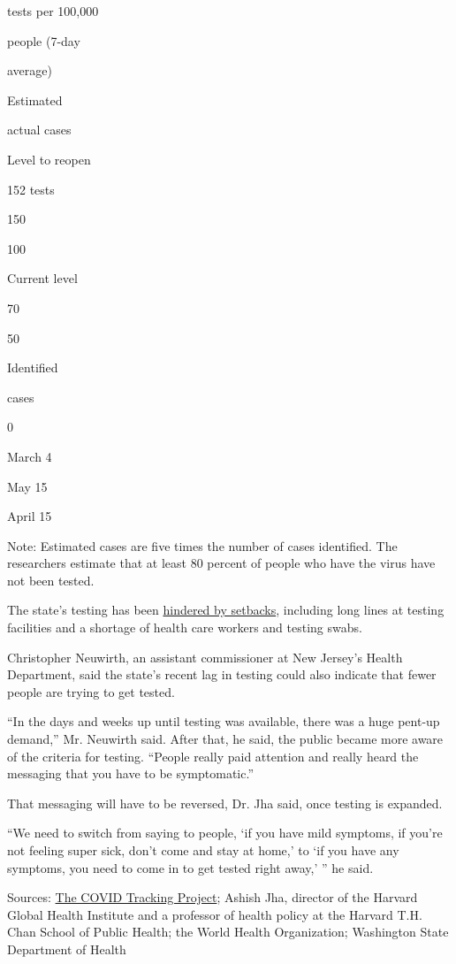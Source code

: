 tests per 100,000

people (7-day

average)

Estimated

actual cases

Level to reopen

152 tests

150

100

Current level

70

50

Identified

cases

0

March 4

May 15

April 15

Note: Estimated cases are five times the number of cases identified. The
researchers estimate that at least 80 percent of people who have the
virus have not been tested.

The state's testing has been
\href{https://www.nytimes3xbfgragh.onion/2020/04/13/nyregion/coronavirus-testing.html}{hindered
by setbacks}, including long lines at testing facilities and a shortage
of health care workers and testing swabs.

Christopher Neuwirth, an assistant commissioner at New Jersey's Health
Department, said the state's recent lag in testing could also indicate
that fewer people are trying to get tested.

``In the days and weeks up until testing was available, there was a huge
pent-up demand,'' Mr. Neuwirth said. After that, he said, the public
became more aware of the criteria for testing. ``People really paid
attention and really heard the messaging that you have to be
symptomatic.''

That messaging will have to be reversed, Dr. Jha said, once testing is
expanded.

``We need to switch from saying to people, `if you have mild symptoms,
if you're not feeling super sick, don't come and stay at home,' to `if
you have any symptoms, you need to come in to get tested right away,' ''
he said.

Sources: \href{https://covidtracking.com/}{The COVID Tracking Project};
Ashish Jha, director of the Harvard Global Health Institute and a
professor of health policy at the Harvard T.H. Chan School of Public
Health; the World Health Organization; Washington State Department of
Health

